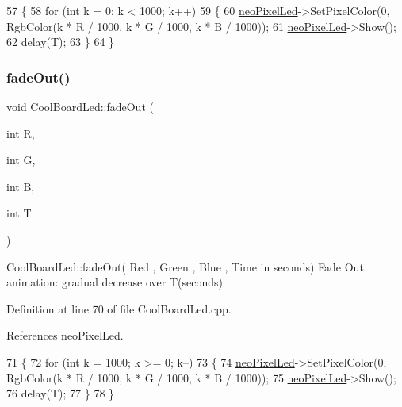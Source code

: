 \begin{DoxyCode}
57 \{
58     \textcolor{keywordflow}{for} (\textcolor{keywordtype}{int} k = 0; k < 1000; k++) 
59     \{
60         \hyperlink{classCoolBoardLed_ac2c13fa462a010cd9242bf297c013923}{neoPixelLed}->SetPixelColor(0, RgbColor(k * R / 1000, k * G / 1000, k * B / 1000));
61         \hyperlink{classCoolBoardLed_ac2c13fa462a010cd9242bf297c013923}{neoPixelLed}->Show();
62         delay(T);
63     \}
64 \}
\end{DoxyCode}
\mbox{\label{classCoolBoardLed_a27c4e14fa2cd3639c0844152cea98887}} 
\subsubsection{\texorpdfstring{fade\+Out()}{fadeOut()}}
{\footnotesize\ttfamily void Cool\+Board\+Led\+::fade\+Out (\begin{DoxyParamCaption}\item[{int}]{R,  }\item[{int}]{G,  }\item[{int}]{B,  }\item[{int}]{T }\end{DoxyParamCaption})}

Cool\+Board\+Led\+::fade\+Out( Red , Green , Blue , Time in seconds) Fade Out animation\+: gradual decrease over T(seconds) 

Definition at line 70 of file Cool\+Board\+Led.\+cpp.



References neo\+Pixel\+Led.


\begin{DoxyCode}
71 \{
72     \textcolor{keywordflow}{for} (\textcolor{keywordtype}{int} k = 1000; k >= 0; k--) 
73     \{
74         \hyperlink{classCoolBoardLed_ac2c13fa462a010cd9242bf297c013923}{neoPixelLed}->SetPixelColor(0, RgbColor(k * R / 1000, k * G / 1000, k * B / 1000));
75         \hyperlink{classCoolBoardLed_ac2c13fa462a010cd9242bf297c013923}{neoPixelLed}->Show();
76         delay(T);
77     \}
78 \}
\end{DoxyCode}
\mbox{\label{classCoolBoardLed_a8ed3053a36f0ed4a131f43b5b17efb61}} 
